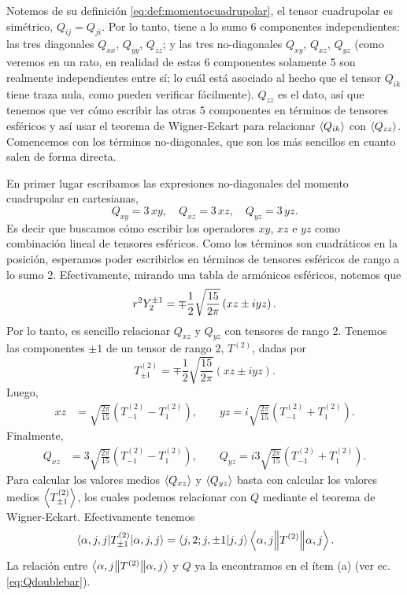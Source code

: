 \documentclass[10pt, a4paper]{article}
\numberwithin{equation}{subsection}
\begin{document}
Notemos de su definición \eqref{eq:def:momentocuadrupolar}, el tensor
cuadrupolar es simétrico, $Q_{ij} = Q_{ji}$. Por lo tanto, tiene a lo sumo 6
componentes independientes: las tres diagonales $Q_{xx}$, $Q_{yy}$, $Q_{zz}$; y
las tres no-diagonales $Q_{xy}$, $Q_{xz}$, $Q_{yz}$ (como veremos en un rato,
en realidad de estas 6 componentes solamente 5 son realmente independientes
entre sí; lo cuál está asociado al hecho que el tensor $Q_{ik}$ tiene traza
nula, como pueden verificar fácilmente). $Q_{zz}$ es el dato, así que tenemos
que ver cómo escribir las otras 5 componentes en términos de tensores esféricos
y así usar el teorema de Wigner-Eckart para relacionar $\expval{Q_{ik}}$ con
$\expval{Q_{zz}}$. Comencemos con los términos no-diagonales, que son los más
sencillos en cuanto salen de forma directa.

En primer lugar escribamos las expresiones no-diagonales del momento
cuadrupolar en cartesianas,
\begin{equation}
  Q_{xy} = 3\,xy, \quad Q_{xz} = 3\,xz, \quad Q_{yz} = 3\,yz.
\end{equation}
Es decir que buscamos cómo escribir los operadores $xy$, $xz$ e $yz$ como
combinación lineal de tensores esféricos. Como los términos son cuadráticos en
la posición, esperamos poder escribirlos en términos de tensores esféricos
de rango a lo sumo 2. Efectivamente, mirando una tabla de armónicos
esféricos, notemos que
\begin{equation}
  r^2\SphericalHarmonic{2}{\pm1} = \mp\frac{1}{2}\sqrt{\frac{15}{2\pi}}
  \left(xz \pm iyz\right).
\end{equation}
Por lo tanto, es sencillo relacionar $Q_{xz}$ y $Q_{yz}$ con tensores de rango
2. Tenemos las componentes $\pm1$ de un tensor de rango 2, $T^{(2)}$, dadas por
\begin{equation}
  T^{(2)}_{\pm1} = \mp\frac{1}{2}\sqrt{\frac{15}{2\pi}}
  \left(xz \pm iyz\right).
\end{equation}
Luego,
\begin{align}
  xz &= \sqrt{\frac{2\pi}{15}}\left(T^{(2)}_{-1} - T^{(2)}_{1}\right), \qquad
  yz = i\sqrt{\frac{2\pi}{15}}\left(T^{(2)}_{-1} + T^{(2)}_{1}\right).
\end{align}
Finalmente,
\begin{align}
  Q_{xz} &= 3\sqrt{\frac{2\pi}{15}}\left(T^{(2)}_{-1} - T^{(2)}_{1}\right), \qquad
  Q_{yz} = i3\sqrt{\frac{2\pi}{15}}\left(T^{(2)}_{-1} + T^{(2)}_{1}\right).
\end{align}
Para calcular los valores medios $\expval{Q_{xz}}$ y $\expval{Q_{yz}}$ basta
con calcular los valores medios $\expval{T^{(2)}_{\pm1}}$, los cuales podemos
relacionar con $Q$ mediante el teorema de Wigner-Eckart. Efectivamente tenemos
\begin{align}
  \expval{T^{(2)}_{\pm1}}{\alpha,j,j} = \braket{j,2;j,\pm1}{j,j}
    \left\langle{\alpha,j}\middle\|{T^{(2)}}\middle\|{\alpha,j}\right\rangle.
\end{align}
La relación entre $\left\langle{\alpha,j}\middle\|{T^{(2)}}\middle\|{\alpha,j}\right\rangle$ y $Q$ ya la
encontramos en el ítem (a) (ver ec. \eqref{eq:Qdoublebar}).
\end{document}
